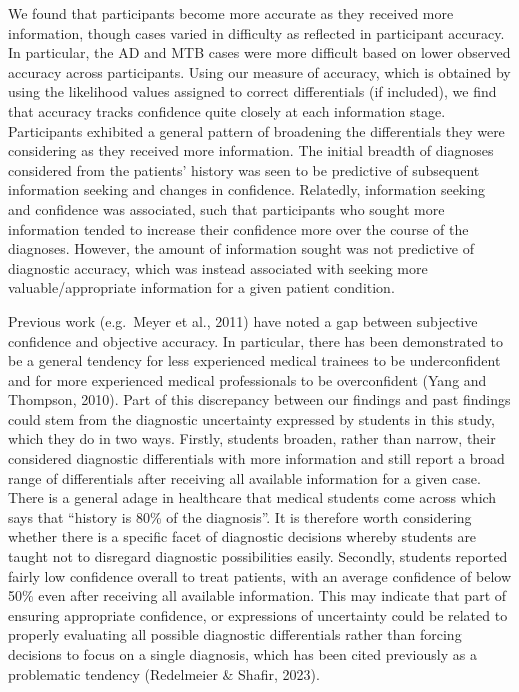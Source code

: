 \documentclass[a4paper, nobind]{templates/ociamthesis}
\begin{document}
We found that participants become more accurate as they received more information, though cases varied in difficulty as reflected in participant accuracy. In particular, the AD and MTB cases were more difficult based on lower observed accuracy across participants. Using our measure of accuracy, which is obtained by using the likelihood values assigned to correct differentials (if included), we find that accuracy tracks confidence quite closely at each information stage. Participants exhibited a general pattern of broadening the differentials they were considering as they received more information. The initial breadth of diagnoses considered from the patients' history was seen to be predictive of subsequent information seeking and changes in confidence. Relatedly, information seeking and confidence was associated, such that participants who sought more information tended to increase their confidence more over the course of the diagnoses. However, the amount of information sought was not predictive of diagnostic accuracy, which was instead associated with seeking more valuable/appropriate information for a given patient condition.

Previous work (e.g.~Meyer et al., 2011) have noted a gap between subjective confidence and objective accuracy. In particular, there has been demonstrated to be a general tendency for less experienced medical trainees to be underconfident and for more experienced medical professionals to be overconfident (Yang and Thompson, 2010). Part of this discrepancy between our findings and past findings could stem from the diagnostic uncertainty expressed by students in this study, which they do in two ways. Firstly, students broaden, rather than narrow, their considered diagnostic differentials with more information and still report a broad range of differentials after receiving all available information for a given case. There is a general adage in healthcare that medical students come across which says that ``history is 80\% of the diagnosis''. It is therefore worth considering whether there is a specific facet of diagnostic decisions whereby students are taught not to disregard diagnostic possibilities easily. Secondly, students reported fairly low confidence overall to treat patients, with an average confidence of below 50\% even after receiving all available information. This may indicate that part of ensuring appropriate confidence, or expressions of uncertainty could be related to properly evaluating all possible diagnostic differentials rather than forcing decisions to focus on a single diagnosis, which has been cited previously as a problematic tendency (Redelmeier \& Shafir, 2023).
\end{document}
